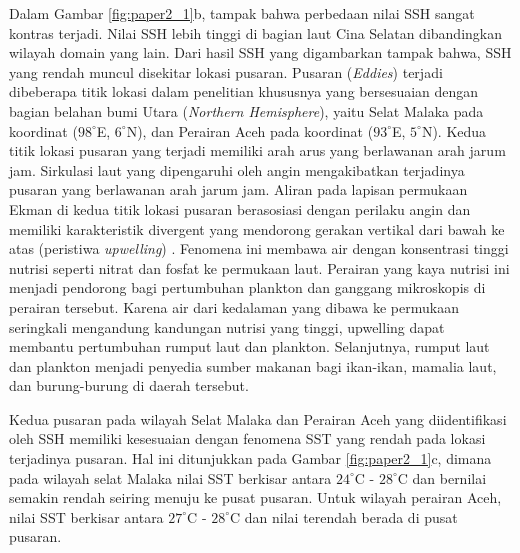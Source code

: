 \begin{spacing}{1.5}
	Dalam Gambar \ref{fig:paper2_1}b, tampak bahwa perbedaan nilai SSH sangat kontras terjadi. Nilai SSH lebih tinggi di bagian laut Cina Selatan dibandingkan wilayah domain yang lain. Dari hasil SSH yang digambarkan tampak bahwa, SSH yang rendah muncul disekitar lokasi pusaran. Pusaran (\textit{Eddies}) terjadi dibeberapa titik lokasi dalam penelitian khususnya yang bersesuaian dengan bagian belahan bumi Utara (\textit{Northern Hemisphere}), yaitu Selat Malaka pada koordinat ($98^\circ$E, $6^\circ$N), dan Perairan Aceh pada koordinat ($93^\circ$E, $5^\circ$N). Kedua titik lokasi pusaran yang terjadi memiliki arah arus yang berlawanan arah jarum jam. Sirkulasi laut yang dipengaruhi oleh angin mengakibatkan terjadinya pusaran yang berlawanan arah jarum jam. Aliran pada lapisan permukaan Ekman di kedua titik lokasi pusaran berasosiasi dengan perilaku angin dan memiliki karakteristik divergent yang mendorong gerakan vertikal dari bawah ke atas (peristiwa \textit{upwelling}) . Fenomena ini membawa air dengan konsentrasi tinggi nutrisi seperti nitrat dan fosfat ke permukaan laut. Perairan yang kaya nutrisi ini menjadi pendorong bagi pertumbuhan plankton dan ganggang mikroskopis di perairan tersebut. Karena air dari kedalaman yang dibawa ke permukaan seringkali mengandung kandungan nutrisi yang tinggi, upwelling dapat membantu pertumbuhan rumput laut dan plankton. Selanjutnya, rumput laut dan plankton menjadi penyedia sumber makanan bagi ikan-ikan, mamalia laut, dan burung-burung di daerah tersebut.
	
	Kedua pusaran pada wilayah Selat Malaka dan Perairan Aceh yang diidentifikasi oleh SSH memiliki kesesuaian dengan fenomena SST yang rendah pada lokasi terjadinya pusaran. Hal ini ditunjukkan pada Gambar \ref{fig:paper2_1}c, dimana pada wilayah selat Malaka nilai SST berkisar antara $24^\circ$C - $28^\circ$C dan bernilai semakin rendah seiring menuju ke pusat pusaran. Untuk wilayah perairan Aceh, nilai SST berkisar antara $27^\circ$C - $28^\circ$C dan nilai terendah berada di pusat pusaran.
\end{spacing}